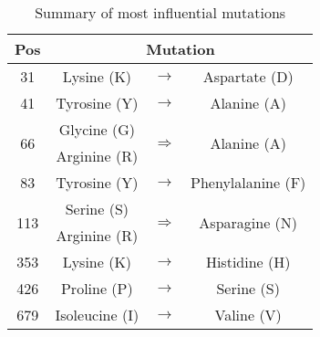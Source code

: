 \begin{table}[ht]
  \centering
  \begin{tabular}[t]{ c | c  c  c }
    \hline
    \textbf{Pos} & \multicolumn{3}{c}{\textbf{Mutation}} \\
    \hline
    31 & Lysine (K) & $\to$ & Aspartate (D){\rule{0pt}{2.6ex}} \\[1mm]
    41 & Tyrosine (Y) & $\to$ & Alanine (A) \\[1mm]
    \multirow{2}{*}{66} & Glycine (G) & \multirow{2}{*}{$\Rightarrow$} & \multirow{2}{*}{Alanine (A)} \\
    & Arginine (R) \\[1mm]
    83 & Tyrosine (Y) & $\to$ & Phenylalanine (F) \\[1mm]
    \multirow{2}{*}{113} & Serine (S) & \multirow{2}{*}{$\Rightarrow$} & \multirow{2}{*}{Asparagine (N)} \\
    & Arginine (R) \\[1mm]
    353 & Lysine (K) & $\to$ & Histidine (H) \\[1mm]
    426 & Proline (P) & $\to$ & Serine (S) \\[1mm]
    679 & Isoleucine (I) & $\to$ & Valine (V) \\[1mm]
    \hline
  \end{tabular}
  \caption{Summary of most influential mutations}
\end{table}
\vspace{-16pt}